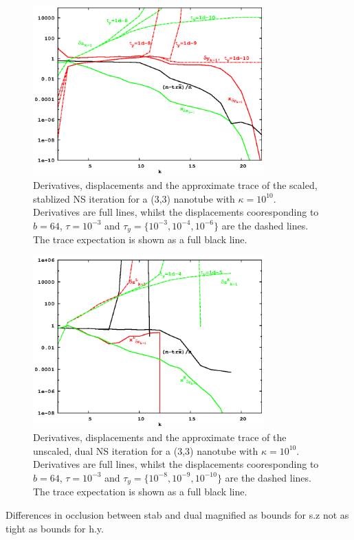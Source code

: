 \documentclass[letterpaper,twocolumn,amsmath,amsfont,amssymb,english,aps,jcp,preprintnumbers,groupaddress,nofootinbib,tightenlines,floatfix]{revtex4}
\theoremstyle{plain}
\theoremstyle{remark}
\theoremstyle{plain}
\begin{document}
\begin{figure}[h] \label{flow_scaled_dual}
\includegraphics[width=3.5in]{fig_33_tube_cond_10_scaled/33_tube_k10_scale_dual.eps}
\caption{Derivatives, displacements and the approximate trace of the scaled, stablized NS iteration for a
(3,3) nanotube with $\kappa =10^{10}$.
Derivatives are full lines, whilst the displacements cooresponding to $b=64$,
$\tau=10^{-3}$ and $\tau_y=\{10^{-3},10^{-4},10^{-6}\}$
are the dashed lines.  The trace expectation is shown as a full black line. }
\end{figure}

\begin{figure}[h]\label{flow_scaled_stab}
\includegraphics[width=3.5in]{fig_33_tube_cond_10_scaled/33_tube_k10_scale_stab.eps}
\caption{Derivatives, displacements and the approximate trace of the unscaled, dual NS iteration for a (3,3) nanotube with $\kappa =10^{10}$.
Derivatives are full lines, whilst the displacements cooresponding to $b=64$, $\tau=10^{-3}$ and $\tau_y=\{10^{-8}, 10^{-9}, 10^{-10}\}$
are the dashed lines.  The trace expectation is shown as a full black line. }
\end{figure}

Differences in occlusion between stab and dual magnified as bounds for s.z not as tight as bounds for h.y.
\end{document}
